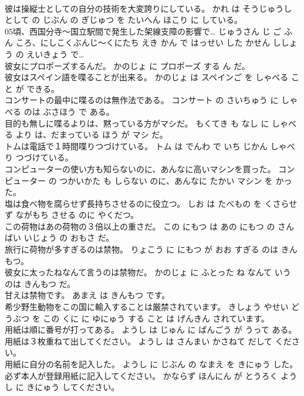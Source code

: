 \documentclass[8pt]{extreport}
\begin{document}
\begin{CJK}{UTF8}{min}
\\	彼は操縦士としての自分の技術を大変誇りにしている。	かれ は そうじゅうし として の じぶん の ぎじゅつ を たいへん ほこり に している。	
\\	05頃、西国分寺～国立駅間で発生した架線支障の影響で…	じゅうさん じ ご ふん ころ、にしこくぶんじ～くにたち えき かん で はっせい した かせん ししょう の えいきょう で…	
\\	彼女にプロポーズするんだ。	かのじょ に プロポーズ する ん だ。	
\\	彼女はスペイン語を喋ることが出来る。	かのじょ は スペインご を しゃべる こと が できる。	
\\	コンサートの最中に喋るのは無作法である。	コンサート の さいちゅう に しゃべる のは ぶさほう で ある。	
\\	目的も無しに喋るよりは、黙っている方がマシだ。	もくてき も なし に しゃべる より は、だまっている ほう が マシ だ。	
\\	トムは電話で１時間喋りつづけている。	トム は でんわ で いち じかん しゃべり つづけている。	
\\	コンピューターの使い方も知らないのに、あんなに高いマシンを買った。	コンピューター の つかいかた も しらない のに、あんなに たかい マシン を かった。	
\\	塩は食べ物を腐らせず長持ちさせるのに役立つ。	しお は たべもの を くさらせず ながもち させる のに やくだつ。	
\\	この荷物はあの荷物の３倍以上の重さだ。	この にもつ は あの にもつ の さんばい いじょう の おもさ だ。	
\\	旅行に荷物が多すぎるのは禁物。	りょこう に にもつ が おお すぎる のは きんもつ。	
\\	彼女に太ったねなんて言うのは禁物だ。	かのじょ に ふとった ね なんて いう のは きんもつ だ。	
\\	甘えは禁物です。	あまえ は きんもつ です。	
\\	希少野生動物をこの国に輸入することは厳禁されています。	きしょう やせい どうぶつ を この くに に ゆにゅう する こと は げんきん されています。	
\\	用紙は順に番号が打ってある。	ようし は じゅん に ばんごう が うって ある。	
\\	用紙は３枚重ねて出してください。	ようし は さんまい かさねて だして ください。	
\\	用紙に自分の名前を記入した。	ようし に じぶん の なまえ を きにゅう した。	
\\	必ず本人が登録用紙に記入してください。	かならず ほんにん が とうろく ようし に きにゅう してください。	

\end{CJK}
\end{document}
